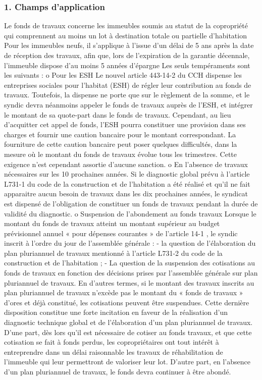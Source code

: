 		\subsubsection{1. Champs d’application}
		
			Le fonds de travaux concerne les immeubles soumis au statut de la copropriété qui comprennent au moins un lot à destination totale ou partielle d’habitation
			Pour les immeubles neufs, il s’applique à l’issue d’un délai de 5 ans après la date de réception des travaux, afin que, lors de l’expiration de la garantie décennale, l’immeuble dispose d’au moins 5 années d’épargne
			Les seuls tempéraments sont les suivants :
			o Pour les ESH
			Le nouvel article 443-14-2 du CCH dispense les entreprises sociales pour l’habitat (ESH) de régler leur contribution au fonds de travaux. Toutefois, la dispense ne porte que sur le règlement de la somme, et le syndic devra néanmoins appeler le fonds de travaux auprès de l’ESH, et intégrer le montant de sa quote-part dans le fonds de travaux. Cependant, au lieu d’acquitter cet appel de fonds, l’ESH pourra constituer une provision dans ses charges et fournir une caution bancaire pour le montant correspondant. La fourniture de cette caution bancaire peut poser quelques difficultés, dans la mesure où le montant du fonds de travaux évolue tous les trimestres. Cette exigence n’est cependant assortie d’aucune sanction.
			o En l’absence de travaux nécessaires sur les 10 prochaines années.
			Si le diagnostic global prévu à l’article L731-1 du code de la construction et de l’habitation a été réalisé et qu’il ne fait apparaitre aucun besoin de travaux dans les dix prochaines années, le syndicat est dispensé de l’obligation de constituer un fonds de travaux pendant la durée de validité du diagnostic.
			o Suspension de l’abondement au fonds travaux
			Lorsque le montant du fonds de travaux atteint un montant supérieur au budget prévisionnel annuel « pour dépenses courantes » de l’article 14-1 , le syndic inscrit à l’ordre du jour de l’assemblée générale :
			- la question de l’élaboration du plan pluriannuel de travaux mentionné à l’article L731-2 du code de la construction et de l’habitation ;
			- La question de la suspension des cotisations au fonds de travaux en fonction des décisions prises par l’assemblée générale sur plan pluriannuel de travaux. En d’autres termes, si le montant des travaux inscrits au plan pluriannuel de travaux n’excède pas le montant du « fonds de travaux » d’ores et déjà constitué, les cotisations peuvent être suspendues.
			Cette dernière disposition constitue une forte incitation en faveur de la réalisation d’un diagnostic technique global et de l’élaboration d’un plan pluriannuel de travaux. D’une part, dès lors qu’il est nécessaire de cotiser au fonds travaux, et que cette cotisation se fait à fonds perdus, les copropriétaires ont tout intérêt à entreprendre dans un délai raisonnable les travaux de réhabilitation de l’immeuble qui leur permettront de valoriser leur lot. D’autre part, en l’absence d’un plan pluriannuel de travaux, le fonds devra continuer à être abondé.
		
